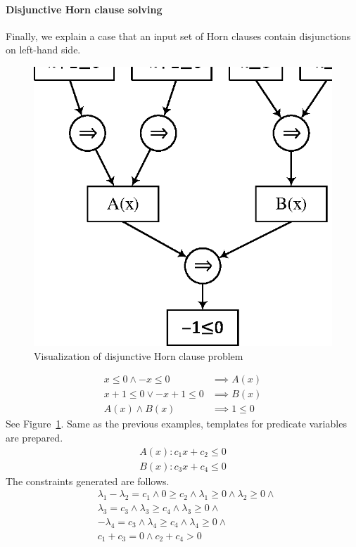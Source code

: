 \paragraph {Disjunctive Horn clause solving}
Finally, we explain a case that an input set of Horn clauses contain
disjunctions on left-hand side.
\begin{figure}
  \begin{center}
    \includegraphics[scale=0.8]{figures/ex3-1.eps}
  \end{center}
  \caption{Visualization of disjunctive Horn clause problem}
  \label{fig:ex31}
\end{figure}
\begin{align*}
x \leq 0 \wedge -x \leq 0 & \implies A(x) \\
x+1 \leq 0 \vee -x+1 \leq 0 & \implies B(x) \\
A(x) \wedge B(x) & \implies 1 \leq 0
\end{align*}
See Figure~\ref{fig:ex31}.  Same as the previous examples, templates
for predicate variables are prepared.
\begin{align*}
A(x) : c_1 x + c_2 \leq 0 \\ B(x) : c_3 x + c_4 \leq 0
\end{align*}
The constraints generated are follows.
\begin{align*}
& \lambda_1 - \lambda_2 = c_1 \wedge 0 \geq c_2 \wedge \lambda_1 \geq 0 \wedge \lambda_2 \geq 0 \wedge \\
& \lambda_3 = c_3 \wedge \lambda_3 \geq c_4 \wedge \lambda_3 \geq 0 \wedge \\
& - \lambda_4 = c_3 \wedge \lambda_4 \geq c_4 \wedge \lambda_4 \geq 0 \wedge \\
& c_1 + c_3 = 0 \wedge c_2 + c_4 > 0
\end{align*}
